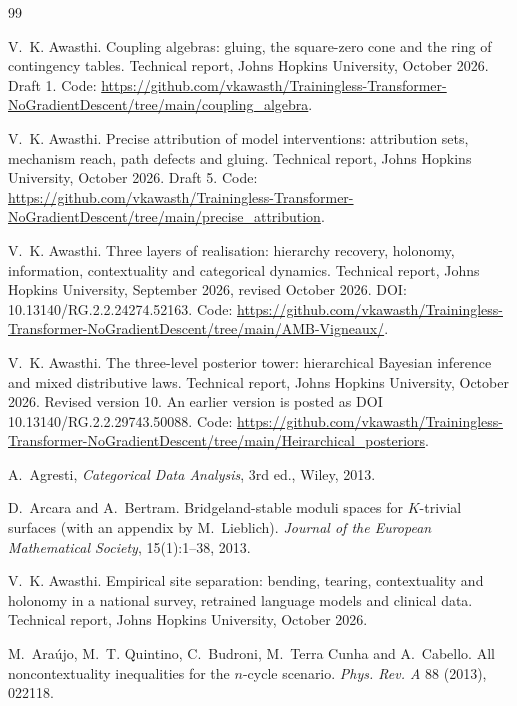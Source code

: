\documentclass[11pt]{article}
\theoremstyle{definition}
\theoremstyle{remark}
\begin{document}
\begin{thebibliography}{99}

V.~K. Awasthi.
\newblock Coupling algebras: gluing, the square-zero cone and the ring of contingency tables.
\newblock Technical report, Johns Hopkins University, October 2026. Draft 1. Code: \url{https://github.com/vkawasth/Trainingless-Transformer-NoGradientDescent/tree/main/coupling_algebra}.

V.~K. Awasthi.
\newblock Precise attribution of model interventions: attribution sets, mechanism reach, path defects
and gluing.
\newblock Technical report, Johns Hopkins University, October 2026. Draft 5. Code: \url{https://github.com/vkawasth/Trainingless-Transformer-NoGradientDescent/tree/main/precise_attribution}.

V.~K. Awasthi.
\newblock Three layers of realisation: hierarchy recovery, holonomy, information, contextuality and categorical dynamics.
\newblock Technical report, Johns Hopkins University, September 2026, revised October 2026.
\newblock DOI: 10.13140/RG.2.2.24274.52163. Code: \url{https://github.com/vkawasth/Trainingless-Transformer-NoGradientDescent/tree/main/AMB-Vigneaux/}.

V.~K. Awasthi.
\newblock The three-level posterior tower: hierarchical {B}ayesian inference and mixed distributive laws.
\newblock Technical report, Johns Hopkins University, October 2026. Revised version 10. An earlier
version is posted as DOI 10.13140/RG.2.2.29743.50088. Code: \url{https://github.com/vkawasth/Trainingless-Transformer-NoGradientDescent/tree/main/Heirarchical_posteriors}.

A.~Agresti, \emph{Categorical Data Analysis}, 3rd ed., Wiley, 2013.

D.~Arcara and A.~Bertram.
\newblock Bridgeland-stable moduli spaces for {$K$}-trivial surfaces (with an appendix by M.~Lieblich).
\newblock \emph{Journal of the European Mathematical Society}, 15(1):1--38, 2013.

V.~K. Awasthi.
\newblock Empirical site separation: bending, tearing, contextuality and holonomy in a national survey, retrained language models and clinical data.
\newblock Technical report, Johns Hopkins University, October 2026.

M.~Ara\'ujo, M.~T. Quintino, C.~Budroni, M.~Terra Cunha and A.~Cabello.
\newblock All noncontextuality inequalities for the $n$-cycle scenario.
\newblock \emph{Phys. Rev. A} 88 (2013), 022118.


\end{thebibliography}
\end{document}
